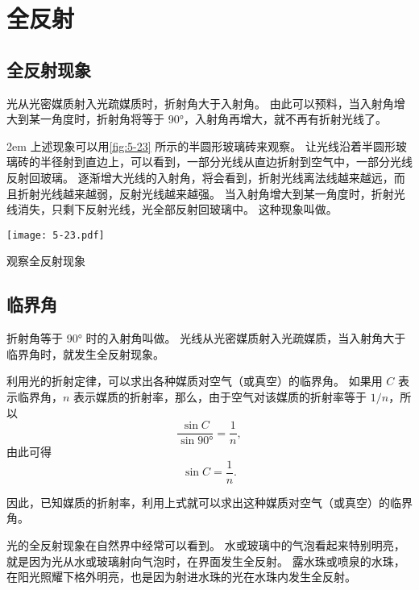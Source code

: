\section{全反射}
\subsection{全反射现象}

光从光密媒质射入光疏媒质时，折射角大于入射角。
由此可以预料，当入射角增大到某一角度时，折射角将等于 \ang{90}，入射角再增大，就不再有折射光线了。

\medskip\noindent
\begin{minipage}{0.6\linewidth}\parindent2em
上述现象可以用\cref{fig:5-23} 所示的半圆形玻璃砖来观察。
让光线沿着半圆形玻璃砖的半径射到直边上，可以看到，一部分光线从直边折射到空气中，一部分光线反射回玻璃。
逐渐增大光线的入射角，将会看到，折射光线离法线越来越远，而且折射光线越来越弱，反射光线越来越强。
当入射角增大到某一角度时，折射光线消失，只剩下反射光线，光全部反射回玻璃中。
这种现象叫做。
\end{minipage}\hfill
\begin{minipage}{0.37\linewidth}\centering
  \begin{figurehere}
    \texttt{[image: 5-23.pdf]}
    \caption{观察全反射现象}\label{fig:5-23}
  \end{figurehere}
\end{minipage}\par\medskip

\subsection{临界角}
折射角等于 \ang{90} 时的入射角叫做。
光线从光密媒质射入光疏媒质，当入射角大于临界角时，就发生全反射现象。

利用光的折射定律，可以求出各种媒质对空气（或真空）的临界角。
如果用 $C$ 表示临界角，$n$ 表示媒质的折射率，那么，由于空气对该媒质的折射率等于 $1/n$，所以
\[\frac{\sin C}{\sin\ang{90}}=\frac{1}{n}, \]
由此可得
\[\sin C=\frac{1}{n}. \]

因此，已知媒质的折射率，利用上式就可以求出这种媒质对空气（或真空）的临界角。

光的全反射现象在自然界中经常可以看到。
水或玻璃中的气泡看起来特别明亮，就是因为光从水或玻璃射向气泡时，在界面发生全反射。
露水珠或喷泉的水珠，在阳光照耀下格外明亮，也是因为射进水珠的光在水珠内发生全反射。

